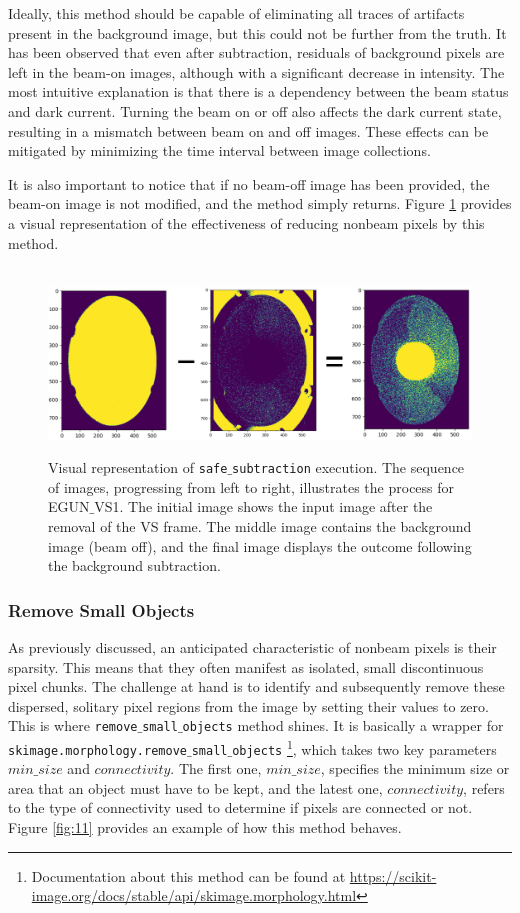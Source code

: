 \documentclass{article}
\begin{document}
Ideally, this method should be capable of eliminating all traces of artifacts present in the background image, but this could not be further from the truth. It has been observed that even after subtraction, residuals of background pixels are left in the beam-on images, although with a significant decrease in intensity. The most intuitive explanation is that there is a dependency between the beam status and dark current. Turning the beam on or off also affects the dark current state, resulting in a mismatch between beam on and off images. These effects can be mitigated by minimizing the time interval between image collections.

It is also important to notice that if no beam-off image has been provided, the beam-on image is not modified, and the method simply returns. Figure \ref{fig:10} provides a visual representation of the effectiveness of reducing nonbeam pixels by this method.

\begin{figure}[!h]  
    \centerline{\ \includegraphics[width=\linewidth]{images/second_step.png}}
    \caption{Visual representation of \texttt{safe$\_$subtraction} execution. The sequence of images, progressing from left to right, illustrates the process for EGUN$\_$VS1. The initial image shows the input image after the removal of the VS frame. The middle image contains the background image (beam off), and the final image displays the outcome following the background subtraction.}
    \label{fig:10}
\end{figure} 
\newpage

\subsubsection{Remove Small Objects}

As previously discussed, an anticipated characteristic of nonbeam pixels is their sparsity. This means that they often manifest as isolated, small discontinuous pixel chunks. The challenge at hand is to identify and subsequently remove these dispersed, solitary pixel regions from the image by setting their values to zero. This is where \texttt{remove$\_$small$\_$objects} method shines. It is basically a wrapper for \texttt{skimage.morphology.remove$\_$small$\_$objects} \footnote{Documentation about this method can be found at \url{https://scikit-image.org/docs/stable/api/skimage.morphology.html}}, which takes two key parameters $min\_size$ and $connectivity$. The first one, $min\_size$, specifies the minimum size or area that an object must have to be kept, and the latest one, $connectivity$, refers to the type of connectivity used to determine if pixels are connected or not. Figure \ref{fig:11} provides an example of how this method behaves. 
    
\end{document}
